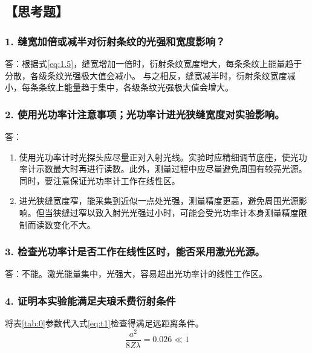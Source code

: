 \documentclass[12pt,a4paper,UTF8]{ctexart}
\begin{document}
\newpage
\subsection*{【思考题】}
\subsubsection*{1. 缝宽加倍或减半对衍射条纹的光强和宽度影响？}
答：根据式\ref{eq:1.5}，缝宽增加一倍时，衍射条纹宽度增大，每条条纹上能量趋于分散，各级条纹光强极大值会减小。
与之相反，缝宽减半时，衍射条纹宽度减小，每条条纹上能量趋于集中，各级条纹光强极大值会增大。
\subsubsection*{2. 使用光功率计注意事项；光功率计进光狭缝宽度对实验影响。}
答：
\begin{enumerate}[label=\arabic*.]
	\item 使用光功率计时光探头应尽量正对入射光线。实验时应精细调节底座，使光功率计示数最大时再进行读数。此外，测量过程中应尽量避免周围有较亮光源。同时，要注意保证光功率计工作在线性区。	
	\item 进光狭缝宽度窄，能采集到近似一点处光强，测量精度更高，避免周围光源影响。但当狭缝过窄以致入射光光强过小时，可能会受光功率计本身测量精度限制而读数变化不大。
\end{enumerate}
\subsubsection*{3. 检查光功率计是否工作在线性区时，能否采用激光光源。}
答：不能。激光能量集中，光强大，容易超出光功率计的线性工作区。
\subsubsection*{4. 证明本实验能满足夫琅禾费衍射条件}
将表\ref{tab:0}参数代入式\ref{eq:t1}检查得满足远距离条件。
\begin{equation}\label{eq:t1}
	\frac{a^2}{8Z\lambda} = 0.026 \ll 1
\end{equation}
\end{document}
